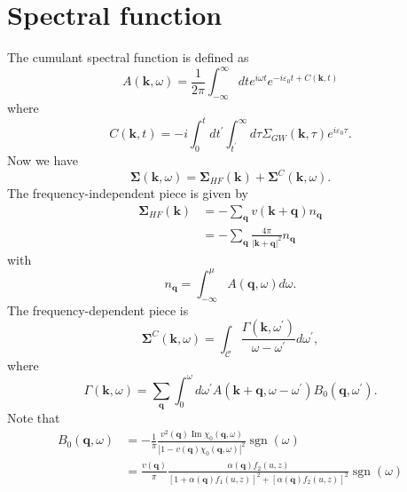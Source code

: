 \section{Spectral function}
The cumulant spectral function is defined as 
\begin{equation}
    A(\bm{k}, \omega)=\frac{1}{2 \pi} \int_{-\infty}^{\infty} d t e^{i \omega t} e^{-i \varepsilon_0 t+C(\bm{k}, t)}
\end{equation}
where
\begin{equation}
    C(\bm{k},t)=-i \int_0^t d t^{\prime} \int_{t^{\prime}}^{\infty} d \tau \Sigma_{G W}(\bm{k}, \tau) e^{i \varepsilon_0 \tau}.
\end{equation}
Now we have 
\begin{equation}
    \mathbf{\Sigma}(\bm{k}, \omega)=\mathbf{\Sigma}_{H F}(\bm{k})+\mathbf{\Sigma}^C(\bm{k}, \omega).
\end{equation}
The frequency-independent piece is given by 
\begin{align}
    \mathbf{\Sigma}_{H F}(\bm{k})&=-\mathbf{\sum}_{\mathbf{q}} v(\bm{k}+\mathbf{q}) n_{\mathbf{q}}\\
&= -\mathbf{\sum}_{\mathbf{q}} \frac{4\pi}{|\bm{k}+\mathbf{q}|^2} n_{\mathbf{q}}
\end{align}
with
\begin{equation}
    n_{\mathbf{q}}=\int_{-\infty}^\mu A(\mathbf{q}, \omega) d \omega.
\end{equation}
The frequency-dependent piece is 
\begin{equation}
    \mathbf{\Sigma}^C(\bm{k}, \omega)=\int_{\mathcal{C}} \frac{\Gamma\left(\bm{k}, \omega^{\prime}\right)}{\omega-\omega^{\prime}} d \omega^{\prime},
\end{equation}
where 
\begin{equation}
    \Gamma(\bm{k}, \omega)=\sum_{\mathbf{q}} \int_0^\omega d \omega^{\prime} A\left(\bm{k}+\mathbf{q}, \omega-\omega^{\prime}\right) B_0\left(\mathbf{q}, \omega^{\prime}\right) .
\end{equation}
Note that 
\begin{align}
    B_0(\mathbf{q}, \omega)&=-\frac{1}{\pi} \frac{v^2(\mathbf{q}) \operatorname{Im} \chi_0(\mathbf{q}, \omega)}{\left|1-v(\mathbf{q}) \chi_0(\mathbf{q}, \omega)\right|^2} \operatorname{sgn} (\omega) \\
&=\frac{v(\bm{q})}{\pi} \frac{\alpha(\bm{q}) f_2(u, z)}{\left[1+\alpha(\bm{q}) f_1(u, z)\right]^2+\left[\alpha(\bm{q}) f_2(u, z)\right]^2} \operatorname{sgn}(\omega)
\end{align}
